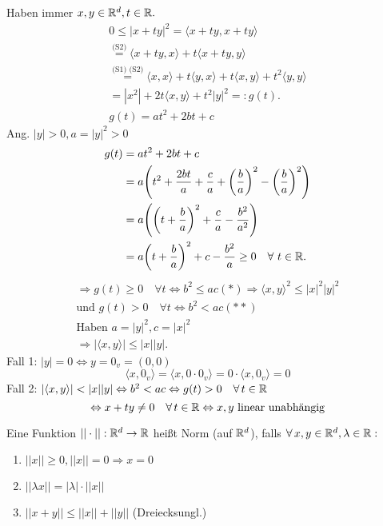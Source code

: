 \documentclass[../ana1.tex]{subfiles}
\begin{document}
\begin{bew}
	Haben immer \( x,y\in\mathbb{R}^d, t\in\mathbb{R}. \)
	\begin{align*}
		0\leq |x+ty|^2 = \langle x+ty, x+ty\rangle \\
		\overset{\text{(S2)}}{=} \langle x+ty,x\rangle + t\langle x+ty,y\rangle \\
		\overset{\text{(S1) (S2)}}{=} \langle x,x\rangle + t \langle y,x\rangle + t\langle x,y\rangle + t^2\langle y,y\rangle \\
		= |x^2| + 2t\langle x,y\rangle + t^2|y|^2 =: g(t).\\
		g(t) = at^2 + 2bt + c
	\end{align*}
	Ang. \(|y| > 0, a = |y|^2 > 0 \)
	\begin{align*}
		g(t) &= at^2 + 2bt + c\\
		&= a{\left(t^2 + \frac{2bt}{a} + \frac{c}{a} 
		+ {\left(\frac{b}{a}\right)}^2 
		- {\left(\frac{b}{a}\right)}^2\right)}\\ 
		&= a{\left({\left(t+\frac{b}{a}\right)}^2 + \frac{c}{a} 
		- \frac{b^2}{a^2}\right)}\\
		&= a{\left(t + \frac{b}{a}\right)}^2 + c - \frac{b^2}{a} \geq 0 
		\quad\forall \, t \in \R.
	\end{align*}
	\begin{align*}
		\Rightarrow g(t) \geq 0 \quad\forall t \Leftrightarrow b^2 \leq ac (*) \Rightarrow \langle x,y\rangle^2 \leq |x|^2|y|^2\\
		\text{und }g(t) > 0 \quad\forall t \Leftrightarrow b^2 < ac (**)\\
		\text{Haben }  a=|y|^2, c=|x|^2\\
		\Rightarrow |\langle x,y\rangle|\leq |x||y|.
	\end{align*}
	Fall 1: \(|y| = 0 \Leftrightarrow y = 0_v = (0, 0)\)
	\[\langle x, 0_v\rangle = \langle x, 0 \cdot 0_v\rangle = 0 \cdot \langle x, 0_v\rangle = 0\]
	Fall 2: \(|\langle x, y\rangle| < |x||y| \Leftrightarrow b^2 < ac \Leftrightarrow g(t) > 0 \quad \forall t \in \R \) \\
	\[\Leftrightarrow x + ty \neq 0 \quad \forall t \in \R \Leftrightarrow x, y \text{ linear unabhängig} \]
\end{bew}
\begin{defi}
	Eine Funktion \( ||\cdot || : \mathbb{R}^d \rightarrow \mathbb{R} \) heißt Norm (auf \( \mathbb{R}^d \)), falls \( \forall x,y\in\R^d, \lambda\in\R: \)
	\begin{enumerate}
		\item \( ||x||\geq 0, ||x|| = 0 \Rightarrow x = 0 \)
		\item \( ||\lambda x|| = |\lambda|\cdot||x|| \)
		\item \( ||x+y|| \leq ||x|| + ||y|| \) (Dreiecksungl.)
	\end{enumerate}
\end{defi}
\end{document}
